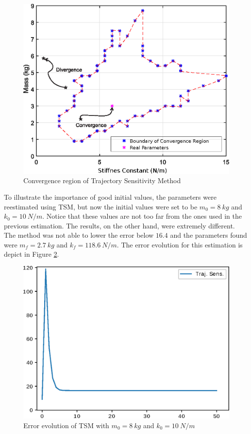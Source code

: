 \begin{figure}[h]
	\caption{Convergence region of Trajectory Sensitivity Method}
	\begin{center}
		\includegraphics[scale=0.7]{Images/Conv_reg.eps}
	\end{center}
	\label{fig: conv_reg}
\end{figure}

To illustrate the importance of good initial values, the parameters were reestimated using TSM, but now the initial values were set to be $m_{0} = 8\ kg$ and $k_{0} = 10\ N/m$. Notice that these values are not too far from the ones used in the previous estimation. The results, on the other hand, were extremely different. The method was not able to lower the error below $16.4$ and the parameters found were $m_{f} = 2.7\ kg$ and $k_{f} = 118.6\ N/m$. The error evolution for this estimation is depict in Figure \ref{fig: TS_nconv}.

\begin{figure}[h]
	\caption{Error evolution of TSM with $m_{0} = 8\ kg$ and $k_{0} = 10\ N/m$}
	\begin{center}
		\includegraphics[scale=0.7]{Images/TS_nconv.eps}
	\end{center}
	\label{fig: TS_nconv}
\end{figure}

